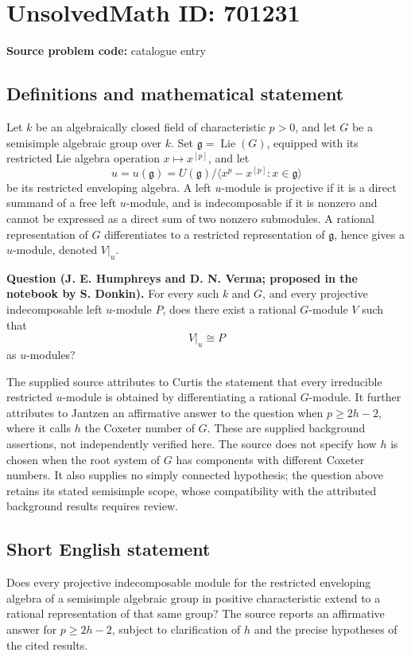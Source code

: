 \documentclass[11pt]{article}
\begin{document}
\section*{UnsolvedMath ID: 701231}
\textbf{Source problem code:} catalogue entry
\subsection{Definitions and mathematical statement}
Let \(k\) be an algebraically closed field of characteristic \(p>0\), and let \(G\) be a semisimple algebraic group over \(k\). Set \(\mathfrak g=\operatorname{Lie}(G)\), equipped with its restricted Lie algebra operation \(x\mapsto x^{[p]}\), and let
\[
u=u(\mathfrak g)=U(\mathfrak g)\big/\langle x^p-x^{[p]}:x\in\mathfrak g\rangle
\]
be its restricted enveloping algebra. A left \(u\)-module is projective if it is a direct summand of a free left \(u\)-module, and is indecomposable if it is nonzero and cannot be expressed as a direct sum of two nonzero submodules. A rational representation of \(G\) differentiates to a restricted representation of \(\mathfrak g\), hence gives a \(u\)-module, denoted \(V|_u\).

\textbf{Question (J. E. Humphreys and D. N. Verma; proposed in the notebook by S. Donkin).} For every such \(k\) and \(G\), and every projective indecomposable left \(u\)-module \(P\), does there exist a rational \(G\)-module \(V\) such that
\[
V|_u\cong P
\]
as \(u\)-modules?

The supplied source attributes to Curtis the statement that every irreducible restricted \(u\)-module is obtained by differentiating a rational \(G\)-module. It further attributes to Jantzen an affirmative answer to the question when \(p\geq 2h-2\), where it calls \(h\) the Coxeter number of \(G\). These are supplied background assertions, not independently verified here. The source does not specify how \(h\) is chosen when the root system of \(G\) has components with different Coxeter numbers. It also supplies no simply connected hypothesis; the question above retains its stated semisimple scope, whose compatibility with the attributed background results requires review.
\subsection{Short English statement}
Does every projective indecomposable module for the restricted enveloping algebra of a semisimple algebraic group in positive characteristic extend to a rational representation of that same group? The source reports an affirmative answer for \(p\geq 2h-2\), subject to clarification of \(h\) and the precise hypotheses of the cited results.
\end{document}
